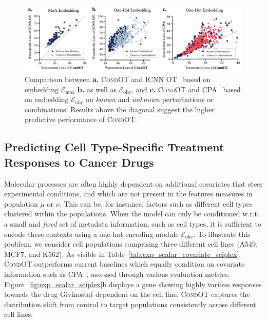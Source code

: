 
\begin{figure}[t]
    \includegraphics[width=\textwidth]{figures/fig_action_comb_comparison_scatter.pdf}
    \caption{Comparison between \textbf{a.} \textsc{CondOT} and \textsc{ICNN OT}~\citep{makkuva2020optimal} based on embedding $\mathcal{E}_\text{moa}$ \textbf{b.} as well as $\mathcal{E}_\text{ohe}$, and \textbf{c.} \textsc{CondOT} and \textsc{CPA}~\citep{lotfollahi2021compositional} based on embedding $\mathcal{E}_\text{ohe}$ on \emph{known} and \emph{unknown} perturbations or combinations. Results above the diagonal suggest the higher predictive performance of \textsc{CondOT}.}
    \label{fig:exp_action_norman_scatter}
\end{figure}


\subsection{Predicting Cell Type-Specific Treatment Responses to Cancer Drugs} \label{sec:eval_covariate}

 Molecular processes are often highly dependent on additional covariates that steer experimental conditions, and which are not present in the features measures in population $\mu$ or $\nu$.
This can be, for instance, factors such as different cell types clustered within the populations.
When the model can only be conditioned w.r.t. a small and \textit{fixed} set of metadata information, such as cell types, it is sufficient to encode these contexts using a one-hot encoding module $\mathcal{E}_\text{ohe}$.
To illustrate this problem, we consider cell populations comprising three different cell lines (A549, MCF7, and K562). As visible in Table~\ref{tab:exp_scalar_covariate_sciplex}, \textsc{CondOT} outperforms current baselines which equally condition on covariate information such as \textsc{CPA}~\citep{lotfollahi2021compositional}, assessed through various evaluation metrics.
Figure~\ref{fig:exp_scalar_sciplex}b displays a gene showing highly various responses towards the drug Givinostat dependent on the cell line. \textsc{CondOT} captures the distribution shift from control to target populations consistently across different cell lines.

